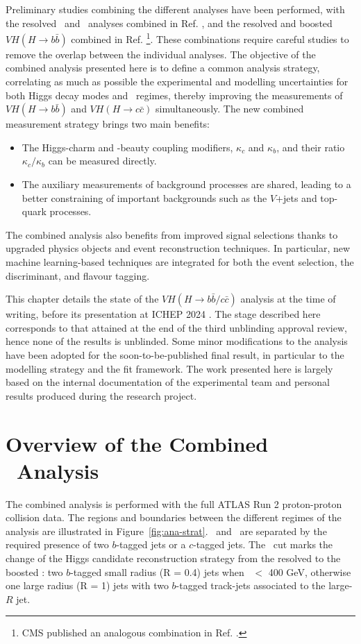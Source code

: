 Preliminary studies combining the different analyses have been performed, with the resolved \vhb\ and \vhc\ analyses combined in Ref. \cite{Collaboration:2721696}, and the resolved and boosted $VH (H \rightarrow b\bar{b})$ combined in Ref. \cite{ATLAS:2021wqh}\footnote{CMS published an analogous combination in Ref. \cite{CMS-PAS-HIG-20-001}.}. These combinations require careful studies to remove the overlap between the individual analyses. The objective of the combined analysis presented here is to define a common analysis strategy, correlating as much as possible the experimental and modelling uncertainties for both Higgs decay modes and \ptv\ regimes, thereby improving the measurements of $VH (H \rightarrow b\bar{b})$ and $VH (H \rightarrow c\bar{c})$ simultaneously. The new combined measurement strategy brings two main benefits: 
\begin{itemize}
\item The Higgs-charm and -beauty coupling modifiers, $\kappa_c$ and $\kappa_b$, and their ratio $\kappa_c/\kappa_b$ can be measured directly. 
\item The auxiliary measurements of background processes are shared, leading to a better constraining of important backgrounds such as the $V$+jets and top-quark processes.
\end{itemize}
The combined analysis also benefits from improved signal selections thanks to upgraded physics objects and event reconstruction techniques. In particular, new machine learning-based techniques are integrated for both the event selection, the discriminant, and flavour tagging.

This chapter details the state of the $VH (H\rightarrow b\bar{b}/c\bar{c})$ analysis at the time of writing, before its presentation at ICHEP 2024 \cite{ATLAS-CONF-2024-010}. The stage described here corresponds to that attained at the end of the third unblinding approval review, hence none of the results is unblinded. Some minor modifications to the analysis have been adopted for the soon-to-be-published final result, in particular to the modelling strategy and the fit framework. The work presented here is largely based on the internal documentation of the experimental team and personal results produced during the research project. 

\section[Overview of the Combined \vhbc\ Analysis]{Overview of the Combined \boldvhbc\ Analysis}
The combined analysis is performed with the full ATLAS Run 2 proton-proton collision data. The regions and boundaries between the different regimes of the analysis are illustrated in Figure~\ref{fig:ana-strat}. \vhb\ and \vhc\ are separated by the required presence of two $b$-tagged jets or a $c$-tagged jets. The \ptv\ cut marks the change of the Higgs candidate reconstruction strategy from the resolved to the boosted \vhb: two $b$-tagged small radius (R = 0.4) jets when \ptv\ $<$ 400 GeV, otherwise one large radius (R = 1) jets with two $b$-tagged track-jets associated to the large-$R$ jet.

